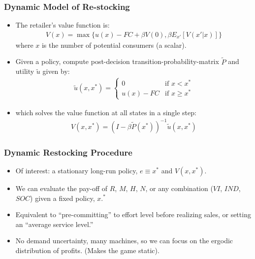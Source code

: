 \begin{frame}
\frametitle{Dynamic Model of Re-stocking}
\begin{itemize}
\item The retailer's value function is:
\begin{eqnarray}
\label{bellman}
V(x) = \max \{u(x) - FC + \beta V(0), \beta E_{x'}[V(x' | x)]\}
\end{eqnarray}
where $x$ is the number of potential consumers (a scalar).
\item Given a policy, compute post-decision transition-probability-matrix $\tilde{P}$ and utility $\tilde{u}$ given by:
\begin{eqnarray*}
 \tilde{u}(x,x^{*})= \begin{cases} 0 &\mbox{if } x < x^{*} \\ 
u(x) - FC & \mbox{if } x \geq x^{*}
 \end{cases}
\end{eqnarray*}
\item which solves the value function at all states in a single step:
\begin{eqnarray}
\label{pistep}
V(x,x^{*}) = (I - \beta \tilde{P}(x^{*}))^{-1} \tilde{u}(x,x^{*}) 
\end{eqnarray}
\end{itemize}
\end{frame}


\begin{frame}
\frametitle{Dynamic Restocking Procedure}
\small
\begin{itemize}
\item Of interest: a stationary long-run policy, $e \equiv x^{*}$ and $V(x,x^{*}).$
\item We can evaluate the pay-off of $R$, $M$, $H$, $N$, or any combination ($VI$, $IND$, $SOC$) given a fixed policy, $x.^*$
\item Equivalent to ``pre-committing'' to effort level before realizing sales, or setting an ``average service level.'' 
\item No demand uncertainty, many machines, so we can focus on the ergodic distribution of profits. (Makes the game static).
\end{itemize}
\end{frame}




